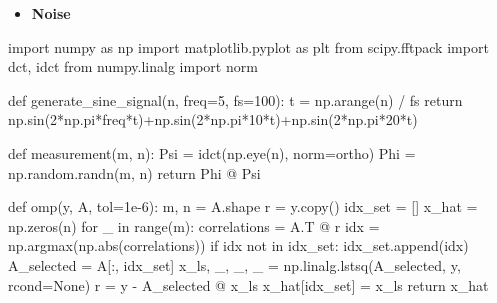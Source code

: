 \documentclass[
  letterpaper,
  DIV=11,
  numbers=noendperiod]{scrartcl}
\newenvironment{Shaded}{\begin{snugshade}}{\end{snugshade}}
\newcommand{\BuiltInTok}[1]{\textcolor[rgb]{0.40,0.85,0.94}{#1}}
\newcommand{\ControlFlowTok}[1]{\textcolor[rgb]{0.98,0.15,0.45}{#1}}
\newcommand{\DecValTok}[1]{\textcolor[rgb]{0.68,0.51,1.00}{#1}}
\newcommand{\FloatTok}[1]{\textcolor[rgb]{0.68,0.51,1.00}{#1}}
\newcommand{\ImportTok}[1]{\textcolor[rgb]{0.98,0.15,0.45}{#1}}
\newcommand{\KeywordTok}[1]{\textcolor[rgb]{0.98,0.15,0.45}{#1}}
\newcommand{\NormalTok}[1]{\textcolor[rgb]{0.97,0.97,0.95}{#1}}
\newcommand{\OperatorTok}[1]{\textcolor[rgb]{0.97,0.97,0.95}{#1}}
\newcommand{\StringTok}[1]{\textcolor[rgb]{0.90,0.86,0.45}{#1}}
\newcommand{\VariableTok}[1]{\textcolor[rgb]{0.97,0.97,0.95}{#1}}
\providecommand{\tightlist}{%
  \setlength{\itemsep}{0pt}\setlength{\parskip}{0pt}}
\begin{document}
\begin{itemize}
\tightlist
\item
  \textbf{Noise}
\end{itemize}

\begin{Shaded}
\begin{Highlighting}[]
\ImportTok{import}\NormalTok{ numpy }\ImportTok{as}\NormalTok{ np}
\ImportTok{import}\NormalTok{ matplotlib.pyplot }\ImportTok{as}\NormalTok{ plt}
\ImportTok{from}\NormalTok{ scipy.fftpack }\ImportTok{import}\NormalTok{ dct, idct}
\ImportTok{from}\NormalTok{ numpy.linalg }\ImportTok{import}\NormalTok{ norm}

\KeywordTok{def}\NormalTok{ generate\_sine\_signal(n, freq}\OperatorTok{=}\DecValTok{5}\NormalTok{, fs}\OperatorTok{=}\DecValTok{100}\NormalTok{):}
\NormalTok{    t }\OperatorTok{=}\NormalTok{ np.arange(n) }\OperatorTok{/}\NormalTok{ fs}
    \ControlFlowTok{return}\NormalTok{ np.sin(}\DecValTok{2}\OperatorTok{*}\NormalTok{np.pi}\OperatorTok{*}\NormalTok{freq}\OperatorTok{*}\NormalTok{t)}\OperatorTok{+}\NormalTok{np.sin(}\DecValTok{2}\OperatorTok{*}\NormalTok{np.pi}\OperatorTok{*}\DecValTok{10}\OperatorTok{*}\NormalTok{t)}\OperatorTok{+}\NormalTok{np.sin(}\DecValTok{2}\OperatorTok{*}\NormalTok{np.pi}\OperatorTok{*}\DecValTok{20}\OperatorTok{*}\NormalTok{t)}

\KeywordTok{def}\NormalTok{ measurement(m, n):}
\NormalTok{    Psi }\OperatorTok{=}\NormalTok{ idct(np.eye(n), norm}\OperatorTok{=}\StringTok{\textquotesingle{}ortho\textquotesingle{}}\NormalTok{)}
\NormalTok{    Phi }\OperatorTok{=}\NormalTok{ np.random.randn(m, n)}
    \ControlFlowTok{return}\NormalTok{ Phi }\OperatorTok{@}\NormalTok{ Psi}

\KeywordTok{def}\NormalTok{ omp(y, A, tol}\OperatorTok{=}\FloatTok{1e{-}6}\NormalTok{):}
\NormalTok{    m, n }\OperatorTok{=}\NormalTok{ A.shape}
\NormalTok{    r }\OperatorTok{=}\NormalTok{ y.copy()}
\NormalTok{    idx\_set }\OperatorTok{=}\NormalTok{ []}
\NormalTok{    x\_hat }\OperatorTok{=}\NormalTok{ np.zeros(n)}
    \ControlFlowTok{for}\NormalTok{ \_ }\KeywordTok{in} \BuiltInTok{range}\NormalTok{(m):}
\NormalTok{        correlations }\OperatorTok{=}\NormalTok{ A.T }\OperatorTok{@}\NormalTok{ r}
\NormalTok{        idx }\OperatorTok{=}\NormalTok{ np.argmax(np.}\BuiltInTok{abs}\NormalTok{(correlations))}
        \ControlFlowTok{if}\NormalTok{ idx }\KeywordTok{not} \KeywordTok{in}\NormalTok{ idx\_set:}
\NormalTok{            idx\_set.append(idx)}
\NormalTok{        A\_selected }\OperatorTok{=}\NormalTok{ A[:, idx\_set]}
\NormalTok{        x\_ls, \_, \_, \_ }\OperatorTok{=}\NormalTok{ np.linalg.lstsq(A\_selected, y, rcond}\OperatorTok{=}\VariableTok{None}\NormalTok{)}
\NormalTok{        r }\OperatorTok{=}\NormalTok{ y }\OperatorTok{{-}}\NormalTok{ A\_selected }\OperatorTok{@}\NormalTok{ x\_ls}
\NormalTok{    x\_hat[idx\_set] }\OperatorTok{=}\NormalTok{ x\_ls}
    \ControlFlowTok{return}\NormalTok{ x\_hat}


\end{Highlighting}
\end{Shaded}
\end{document}
